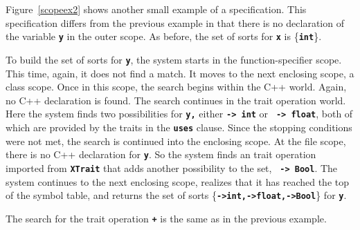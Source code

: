 \documentclass[12pt]{article} %
\newcommand{\reserved}[1]{\textbf{\texttt{#1}}} %
\begin{document}
Figure~\ref{scopeex2} shows another small example of a
specification. This specification differs from the previous example in
that there is no declaration of the variable \reserved{y} in the outer
scope. As before, the set of sorts for \reserved{x} is \{\reserved{int}\}.

To build the set of sorts for
\reserved{y}, the system starts in the function-specifier scope. This
time, again, it does not find a match. It moves to the next
enclosing scope, a class scope. Once in this scope, the search begins
within the C++ world. Again, no C++ declaration is found. The
search continues in the trait operation world. Here the system
finds two possibilities for \reserved{y,} either \reserved{-> int} or \reserved{
-> float}, both of which are provided by the traits in the \reserved{uses}
clause. Since the stopping conditions were not met, the search
is continued into the enclosing scope. At the file scope, there is no
C++ declaration for \reserved{y}. So the system finds an trait
operation imported from \reserved{XTrait} that adds another
possibility to the set, \reserved{ -> Bool}. The system continues to
the next enclosing scope, realizes that it has reached the top of the
symbol table, and returns the set of sorts
\{\reserved{->int,->float,->Bool}\} for \reserved{y}.

The search for the trait operation \reserved{+} is the same as in the
previous example.
\end{document}
